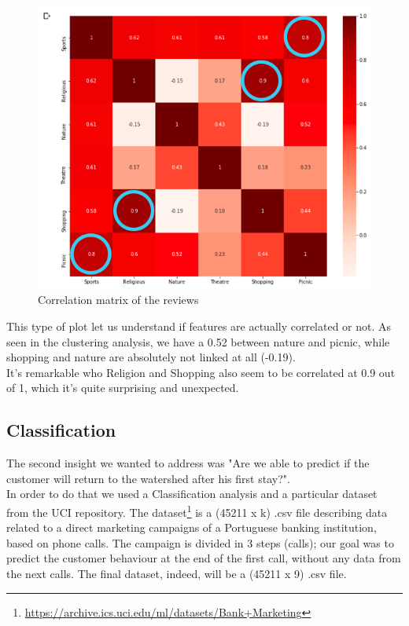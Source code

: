 \begin{figure}[H]
\centering
\includegraphics[width=1\textwidth]{Img/correlation_review.png}
\caption{Correlation matrix of the reviews}
\end{figure}

\noindent This type of plot let us understand if features are actually correlated or not. As seen in the clustering analysis, we have a 0.52 between nature and picnic, while shopping and nature are absolutely not linked at all (-0.19).\\
It's remarkable who Religion and Shopping also seem to be correlated at 0.9 out of 1, which it's quite surprising and unexpected.

\clearpage
\subsection{Classification}
The second insight we wanted to address was "Are we able to predict if the customer will return to the watershed after his first stay?".\\
In order to do that we used a Classification analysis and a particular dataset from the UCI repository. The dataset\footnote{\url{https://archive.ics.uci.edu/ml/datasets/Bank+Marketing}} is a (45211 x k) .csv file describing data related to a direct marketing campaigns of a Portuguese banking institution, based on phone calls. The campaign is divided in 3 steps (calls); our goal was to predict the customer behaviour at the end of the first call, without any data from the next calls. The final dataset, indeed, will be a (45211 x 9) .csv file.

